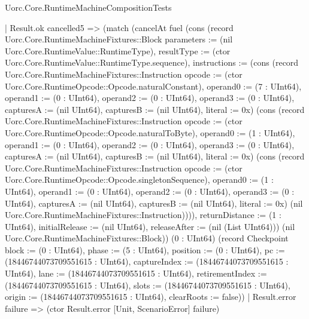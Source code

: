 \begin{lexlean}{Uorc.Core.RuntimeMachineCompositionTests}
\begin{semanticmodule}
{              | Result.ok cancelled5 => (match (cancelAt fuel (cons (record Uorc.Core.RuntimeMachineFixtures::Block {parameters := (nil Uorc.Core.RuntimeValue::RuntimeType), resultType := (ctor Uorc.Core.RuntimeValue::RuntimeType.sequence), instructions := (cons (record Uorc.Core.RuntimeMachineFixtures::Instruction {opcode := (ctor Uorc.Core.RuntimeOpcode::Opcode.naturalConstant), operand0 := (7 : UInt64), operand1 := (0 : UInt64), operand2 := (0 : UInt64), operand3 := (0 : UInt64), capturesA := (nil UInt64), capturesB := (nil UInt64), literal := 0x}) (cons (record Uorc.Core.RuntimeMachineFixtures::Instruction {opcode := (ctor Uorc.Core.RuntimeOpcode::Opcode.naturalToByte), operand0 := (1 : UInt64), operand1 := (0 : UInt64), operand2 := (0 : UInt64), operand3 := (0 : UInt64), capturesA := (nil UInt64), capturesB := (nil UInt64), literal := 0x}) (cons (record Uorc.Core.RuntimeMachineFixtures::Instruction {opcode := (ctor Uorc.Core.RuntimeOpcode::Opcode.singletonSequence), operand0 := (1 : UInt64), operand1 := (0 : UInt64), operand2 := (0 : UInt64), operand3 := (0 : UInt64), capturesA := (nil UInt64), capturesB := (nil UInt64), literal := 0x}) (nil Uorc.Core.RuntimeMachineFixtures::Instruction)))), returnDistance := (1 : UInt64), initialRelease := (nil UInt64), releaseAfter := (nil (List UInt64))}) (nil Uorc.Core.RuntimeMachineFixtures::Block)) (0 : UInt64) (record Checkpoint {block := (0 : UInt64), phase := (5 : UInt64), position := (0 : UInt64), pc := (18446744073709551615 : UInt64), captureIndex := (18446744073709551615 : UInt64), lane := (18446744073709551615 : UInt64), retirementIndex := (18446744073709551615 : UInt64), slots := (18446744073709551615 : UInt64), origin := (18446744073709551615 : UInt64), clearRoots := false}))
                | Result.error failure => (ctor Result.error [Unit, ScenarioError] failure)
}
\end{semanticmodule}
\end{lexlean}
